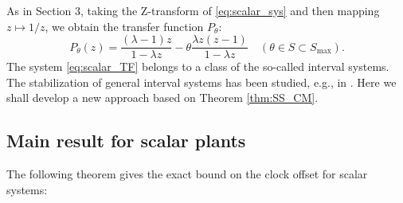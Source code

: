 \documentclass[letterpaper, 12pt, draftcls, onecolumn]{ieeeconf}
\begin{document}
As in Section 3,
taking the Z-transform of
\eqref{eq:scalar_sys} and then
mapping $z \mapsto 1/z$, we obtain the transfer function $P_{\theta}$:
\begin{equation}
\label{eq:scalar_TF}
P_{\theta} (z) 
=
\frac{(\lambda -1)z}{1-\lambda z}
-
\theta
\frac{\lambda z(z-1)}{1-\lambda z}\quad
(\theta \in S \subset S_{\max}).
\end{equation}
The system \eqref{eq:scalar_TF}
belongs to a class of the so-called interval systems.
The stabilization of general interval systems
has been studied, e.g., in
\cite{Ghosh1988, Olbrot1994}.
Here we shall develop a new approach based on
Theorem \ref{thm:SS_CM}.

\subsection{Main result for scalar plants}
The following theorem gives the exact bound on the 
clock offset for scalar systems:
\end{document}
